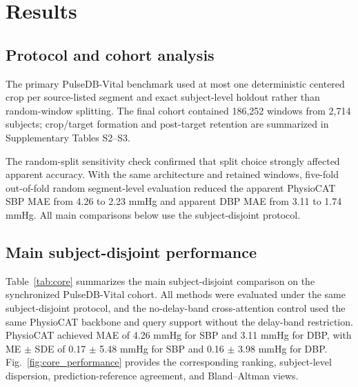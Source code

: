 \documentclass[preprint,12pt]{elsarticle}
\begin{document}
\section{Results}

\subsection{Protocol and cohort analysis}

The primary PulseDB-Vital benchmark used at most one deterministic centered crop per source-listed segment and exact subject-level holdout rather than random-window splitting. The final cohort contained 186{,}252 windows from 2{,}714 subjects; crop/target formation and post-target retention are summarized in Supplementary Tables S2--S3.

The random-split sensitivity check confirmed that split choice strongly affected apparent accuracy. With the same architecture and retained windows, five-fold out-of-fold random segment-level evaluation reduced the apparent PhysioCAT SBP MAE from 4.26 to 2.23 mmHg and apparent DBP MAE from 3.11 to 1.74 mmHg. All main comparisons below use the subject-disjoint protocol.

\subsection{Main subject-disjoint performance}

Table~\ref{tab:core} summarizes the main subject-disjoint comparison on the synchronized PulseDB-Vital cohort. All methods were evaluated under the same subject-disjoint protocol, and the no-delay-band cross-attention control used the same PhysioCAT backbone and query support without the delay-band restriction. PhysioCAT achieved MAE of 4.26 mmHg for SBP and 3.11 mmHg for DBP, with ME $\pm$ SDE of 0.17 $\pm$ 5.48 mmHg for SBP and 0.16 $\pm$ 3.98 mmHg for DBP. Fig.~\ref{fig:core_performance} provides the corresponding ranking, subject-level dispersion, prediction-reference agreement, and Bland--Altman views.
\end{document}
